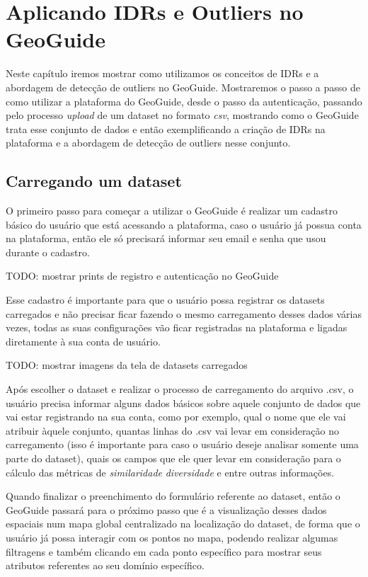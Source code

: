 \chapter{Aplicando IDRs e Outliers no GeoGuide}

Neste capítulo iremos mostrar como utilizamos os conceitos de IDRs e a abordagem de detecção de outliers no GeoGuide. Mostraremos o passo a passo de como utilizar a plataforma do GeoGuide, desde o passo da autenticação, passando pelo processo \textit{upload} de um dataset no formato \textit{csv}, mostrando como o GeoGuide trata esse conjunto de dados e então exemplificando a criação de IDRs na plataforma e a abordagem de detecção de outliers nesse conjunto.

\section{Carregando um dataset}

O primeiro passo para começar a utilizar o GeoGuide é realizar um cadastro básico do usuário que está acessando a plataforma, caso o usuário já possua conta na plataforma, então ele só precisará informar seu email e senha que usou durante o cadastro.

TODO: mostrar prints de registro e autenticação no GeoGuide

Esse cadastro é importante para que o usuário possa registrar os datasets carregados e não precisar ficar fazendo o mesmo carregamento desses dados várias vezes, todas as suas configurações vão ficar registradas na plataforma e ligadas diretamente à sua conta de usuário.

TODO: mostrar imagens da tela de datasets carregados

Após escolher o dataset e realizar o processo de carregamento do arquivo .csv, o usuário precisa informar alguns dados básicos sobre aquele conjunto de dados que vai estar registrando na sua conta, como por exemplo, qual o nome que ele vai atribuir àquele conjunto, quantas linhas do .csv vai levar em consideração no carregamento (isso é importante para caso o usuário deseje analisar somente uma parte do dataset), quais os campos que ele quer levar em consideração para o cálculo das métricas de \textit{similaridade} \textit{diversidade} e entre outras informações.

Quando finalizar o preenchimento do formulário referente ao dataset, então o GeoGuide passará para o próximo passo que é a visualização desses dados espaciais num mapa global centralizado na localização do dataset, de forma que o usuário já possa interagir com os pontos no mapa, podendo realizar algumas filtragens e também clicando em cada ponto específico para mostrar seus atributos referentes ao seu domínio específico.

